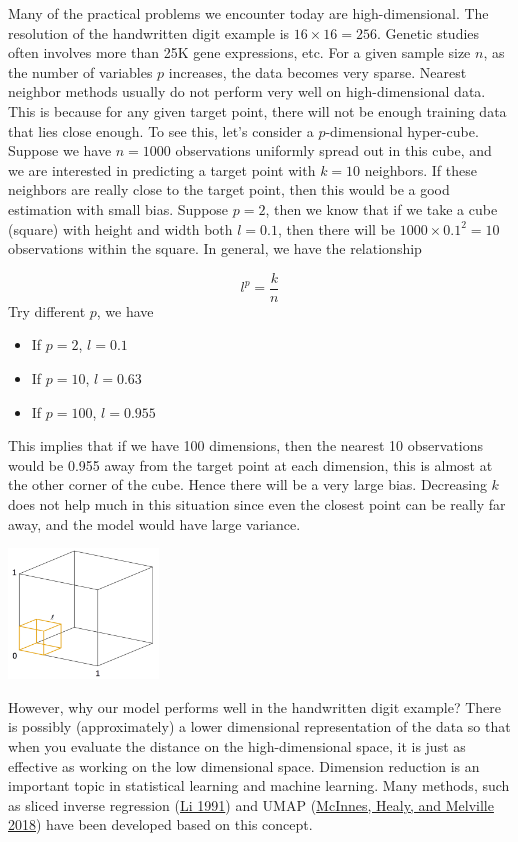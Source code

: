 \documentclass[
]{book}
\providecommand{\tightlist}{%
  \setlength{\itemsep}{0pt}\setlength{\parskip}{0pt}}
\theoremstyle{definition}
\theoremstyle{definition}
\theoremstyle{definition}
\theoremstyle{definition}
\theoremstyle{remark}
\begin{document}
Many of the practical problems we encounter today are high-dimensional. The resolution of the handwritten digit example is \(16 \times 16 = 256\). Genetic studies often involves more than 25K gene expressions, etc. For a given sample size \(n\), as the number of variables \(p\) increases, the data becomes very sparse. Nearest neighbor methods usually do not perform very well on high-dimensional data. This is because for any given target point, there will not be enough training data that lies close enough. To see this, let's consider a \(p\)-dimensional hyper-cube. Suppose we have \(n=1000\) observations uniformly spread out in this cube, and we are interested in predicting a target point with \(k=10\) neighbors. If these neighbors are really close to the target point, then this would be a good estimation with small bias. Suppose \(p=2\), then we know that if we take a cube (square) with height and width both \(l = 0.1\), then there will be \(1000 \times 0.1^2 = 10\) observations within the square. In general, we have the relationship

\[l^p = \frac{k}{n}\]
Try different \(p\), we have

\begin{itemize}
\tightlist
\item
  If \(p = 2\), \(l = 0.1\)
\item
  If \(p = 10\), \(l = 0.63\)
\item
  If \(p = 100\), \(l = 0.955\)
\end{itemize}

This implies that if we have 100 dimensions, then the nearest 10 observations would be 0.955 away from the target point at each dimension, this is almost at the other corner of the cube. Hence there will be a very large bias. Decreasing \(k\) does not help much in this situation since even the closest point can be really far away, and the model would have large variance.

\includegraphics[width=0.3\textwidth,height=\textheight]{images/highd.png}

However, why our model performs well in the handwritten digit example? There is possibly (approximately) a lower dimensional representation of the data so that when you evaluate the distance on the high-dimensional space, it is just as effective as working on the low dimensional space. Dimension reduction is an important topic in statistical learning and machine learning. Many methods, such as sliced inverse regression (\protect\hyperlink{ref-li1991sliced}{Li 1991}) and UMAP (\protect\hyperlink{ref-mcinnes2018umap}{McInnes, Healy, and Melville 2018}) have been developed based on this concept.
\end{document}
